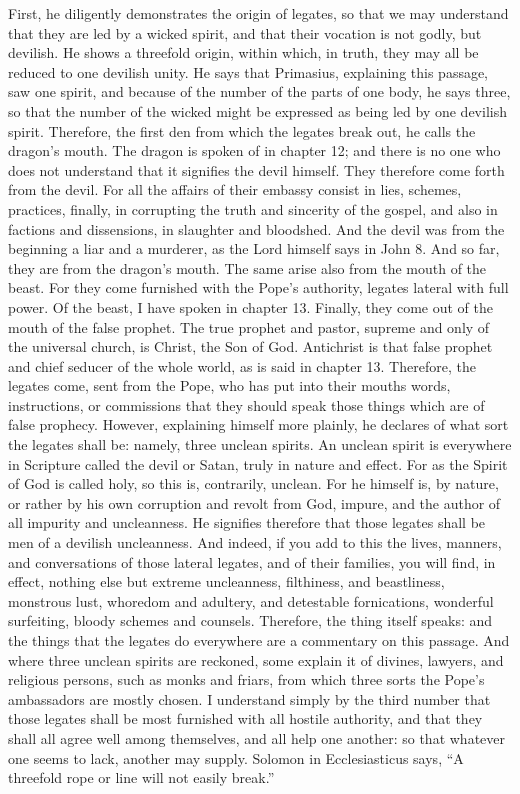 First, he diligently demonstrates the origin of legates, so that we may understand that they are led by a wicked spirit, and that their vocation is not godly, but devilish. He shows a threefold origin, within which, in truth, they may all be reduced to one devilish unity. He says that Primasius, explaining this passage, saw one spirit, and because of the number of the parts of one body, he says three, so that the number of the wicked might be expressed as being led by one devilish spirit. Therefore, the first den from which the legates break out, he calls the dragon’s mouth. The dragon is spoken of in chapter 12; and there is no one who does not understand that it signifies the devil himself. They therefore come forth from the devil. For all the affairs of their embassy consist in lies, schemes, practices, finally, in corrupting the truth and sincerity of the gospel, and also in factions and dissensions, in slaughter and bloodshed. And the devil was from the beginning a liar and a murderer, as the Lord himself says in John 8. And so far, they are from the dragon’s mouth. The same arise also from the mouth of the beast. For they come furnished with the Pope’s authority, legates lateral with full power. Of the beast, I have spoken in chapter 13. Finally, they come out of the mouth of the false prophet. The true prophet and pastor, supreme and only of the universal church, is Christ, the Son of God. Antichrist is that false prophet and chief seducer of the whole world, as is said in chapter 13. Therefore, the legates come, sent from the Pope, who has put into their mouths words, instructions, or commissions that they should speak those things which are of false prophecy. However, explaining himself more plainly, he declares of what sort the legates shall be: namely, three unclean spirits. An unclean spirit is everywhere in Scripture called the devil or Satan, truly in nature and effect. For as the Spirit of God is called holy, so this is, contrarily, unclean. For he himself is, by nature, or rather by his own corruption and revolt from God, impure, and the author of all impurity and uncleanness. He signifies therefore that those legates shall be men of a devilish uncleanness. And indeed, if you add to this the lives, manners, and conversations of those lateral legates, and of their families, you will find, in effect, nothing else but extreme uncleanness, filthiness, and beastliness, monstrous lust, whoredom and adultery, and detestable fornications, wonderful surfeiting, bloody schemes and counsels. Therefore, the thing itself speaks: and the things that the legates do everywhere are a commentary on this passage. And where three unclean spirits are reckoned, some explain it of divines, lawyers, and religious persons, such as monks and friars, from which three sorts the Pope’s ambassadors are mostly chosen. I understand simply by the third number that those legates shall be most furnished with all hostile authority, and that they shall all agree well among themselves, and all help one another: so that whatever one seems to lack, another may supply. Solomon in Ecclesiasticus says, “A threefold rope or line will not easily break.”

